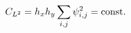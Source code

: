 \documentclass[preview]{standalone}
\begin{document}
\begin{align*}
\special{dvisvgm:raw <g id='unique000'>}C_{L^2}=h_xh_y\sum_{i,j}\psi_{i,j}^2 = \text{const.}\special{dvisvgm:raw </g>}
\end{align*}
\end{document}

